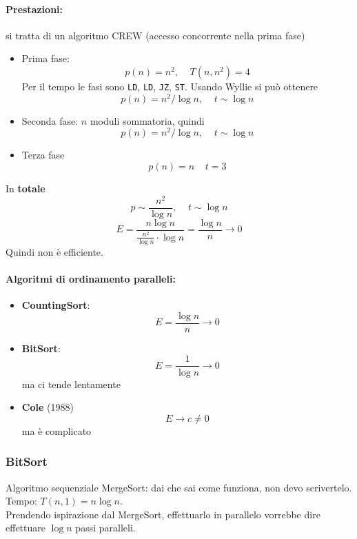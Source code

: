 \paragraph{Prestazioni:} si tratta di un algoritmo CREW (accesso concorrente nella prima fase)
\begin{itemize}
	\item Prima fase: 
	$$ p(n) = n^2, \;\;\;\; T(n, n^2) = 4 $$
	Per il tempo le fasi sono \texttt{LD}, \texttt{LD}, \texttt{JZ}, \texttt{ST}. Usando Wyllie si può ottenere
	$$ p(n) = n^2/\log n, \;\;\;\; t \sim \log n $$
	
	\item Seconda fase: $n$ moduli sommatoria, quindi 
	$$ p(n) = n^2/\log n, \;\;\;\; t \sim \log n $$
	
	\item Terza fase 
	$$ p(n) = n \;\;\;\; t = 3 $$
\end{itemize}

In \textbf{totale}
$$ p \sim \frac{n^2}{\log n}, \;\;\;\; t \sim \log n $$
$$ E = \frac{n \log n}{\frac{n^2}{\log n} \cdot \log n}  = \frac{\log n}{n} \rightarrow 0 $$
Quindi non è efficiente.\\

\vfill

\paragraph{Algoritmi di ordinamento paralleli: }
\begin{itemize}
	\item \textbf{CountingSort}: 
	$$ E =  \frac{\log n}{n} \rightarrow 0 $$
	\item \textbf{BitSort}:
	$$ E = \frac{1}{\log n} \rightarrow 0 $$
	ma ci tende lentamente
	\item \textbf{Cole} (1988)
	$$ E \rightarrow c \neq 0 $$
	ma è complicato
\end{itemize}

\newpage

\subsubsection{BitSort}

Algoritmo sequenziale MergeSort: dai che sai come funziona, non devo scrivertelo. Tempo: $T(n, 1) = n \log n$.\\

Prendendo ispirazione dal MergeSort, effettuarlo in parallelo vorrebbe dire effettuare $\log n$ passi paralleli.\\

